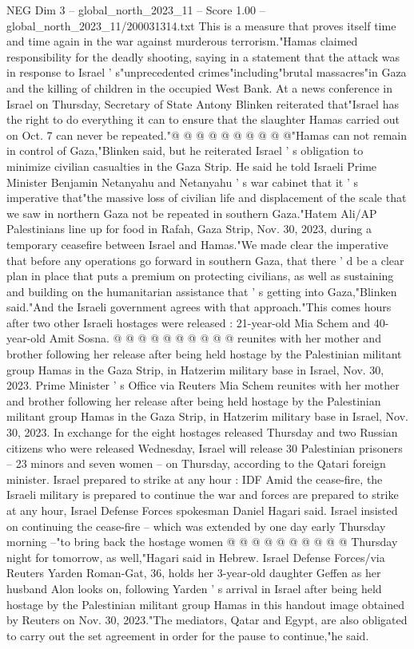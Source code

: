 \begin{textsample}{NEG Dim 3 – global\_north\_2023\_11 – Score 1.00 – global\_north\_2023\_11/200031314.txt}
This is a measure that proves itself time and time again in the war against murderous terrorism."Hamas claimed responsibility for the deadly shooting, saying in a statement that the attack was in response to Israel ' s"unprecedented crimes"including"brutal massacres"in Gaza and the killing of children in the occupied West Bank.
At a news conference in Israel on Thursday, Secretary of State Antony Blinken reiterated that"Israel has the right to do everything it can to ensure that the slaughter Hamas carried out on Oct. 7 can never be repeated."@ @ @ @ @ @ @ @ @ @"Hamas can not remain in control of Gaza,"Blinken said, but he reiterated Israel ' s obligation to minimize civilian casualties in the Gaza Strip.
He said he told Israeli Prime Minister Benjamin Netanyahu and Netanyahu ' s war cabinet that it ' s imperative that"the massive loss of civilian life and displacement of the scale that we saw in northern Gaza not be repeated in southern Gaza."Hatem Ali/AP Palestinians line up for food in Rafah, Gaza Strip, Nov. 30, 2023, during a temporary ceasefire between Israel and Hamas."We made clear the imperative that before any operations go forward in southern Gaza, that there ' d be a clear plan in place that puts a premium on protecting civilians, as well as sustaining and building on the humanitarian assistance that ' s getting into Gaza,"Blinken said."And the Israeli government agrees with that approach."This comes hours after two other Israeli hostages were released : 21-year-old Mia Schem and 40-year-old Amit Sosna. @ @ @ @ @ @ @ @ @ @ reunites with her mother and brother following her release after being held hostage by the Palestinian militant group Hamas in the Gaza Strip, in Hatzerim military base in Israel, Nov. 30, 2023.
Prime Minister ' s Office via Reuters Mia Schem reunites with her mother and brother following her release after being held hostage by the Palestinian militant group Hamas in the Gaza Strip, in Hatzerim military base in Israel, Nov. 30, 2023.
In exchange for the eight hostages released Thursday and two Russian citizens who were released Wednesday, Israel will release 30 Palestinian prisoners -- 23 minors and seven women -- on Thursday, according to the Qatari foreign minister.
Israel prepared to strike at any hour : IDF Amid the cease-fire, the Israeli military is prepared to continue the war and forces are prepared to strike at any hour, Israel Defense Forces spokesman Daniel Hagari said.
Israel insisted on continuing the cease-fire -- which was extended by one day early Thursday morning --"to bring back the hostage women @ @ @ @ @ @ @ @ @ @ Thursday night for tomorrow, as well,"Hagari said in Hebrew.
Israel Defense Forces/via Reuters Yarden Roman-Gat, 36, holds her 3-year-old daughter Geffen as her husband Alon looks on, following Yarden ' s arrival in Israel after being held hostage by the Palestinian militant group Hamas in this handout image obtained by Reuters on Nov. 30, 2023."The mediators, Qatar and Egypt, are also obligated to carry out the set agreement in order for the pause to continue,"he said.

\end{textsample}
